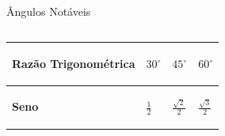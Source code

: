 \documentclass[aspectratio=169, t, 8pt]{beamer}
\begin{document}
    \begin{frame} {Ângulos Notáveis}
        \vspace{1em}
        \begin{columns}[totalwidth=.9\textwidth]
            \begin{column}{\textwidth}
                \begin{tabular}{m{} | m{} | m{} | m{}}

                    \hline
                    \begin{center}
                        \textbf{Razão Trigonométrica}
                    \end{center}    
                    
                     & 
                     \begin{center}
                        \textbf{$30^\circ$}
                     \end{center}
                     
                     &
                     \begin{center}
                        \textbf{$45^\circ$}
                     \end{center}
                     
                     &
                     
                     {
                        \begin{center}
                            \textbf{$60^\circ$}
                        \end{center}
                     }
                     
                     \\
                    
                    \hline

                    \centering\textbf{Seno} &
                    \begin{center}
                        $\displaystyle\frac{1}{2}$    
                    \end{center}
                    &
                    \begin{center}
                        
                        $\displaystyle\frac{\sqrt{2}}{2}$
                    \end{center}
                    
                    & {
                        \begin{center}
                            $\displaystyle\frac{\sqrt{3}}{2}$
                        \end{center}
                        
}
\end{tabular}
\end{column}
\end{columns}
\end{frame}
\end{document}
